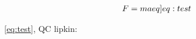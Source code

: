 
\begin{align}
    F = ma \label[eq]{eq:test}
\end{align}

\cref{eq:test}, QC lipkin: \citep{hlatshwayoSimulatingExcitedStates2022}